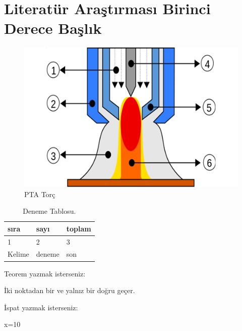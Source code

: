\section{Literatür Araştırması Birinci Derece Başlık}
\lipsum[1-2]
\begin{figure}[h]
\centering
\includegraphics[width=\textwidth]{gorseller/ptaTorc}
\caption{PTA Torç}\label{fig:PtaTorc1}
\end{figure}
\lipsum[1-2]
\begin{table}
\centering
\caption{Deneme Tablosu.}\label{tab:den1}
\begin{tabular}{|l|l|l|}
\hline
sıra   & sayı   & toplam \\ \hline
1      & 2      & 3      \\ \hline
Kelime & deneme & son    \\ \hline
\end{tabular}
\end{table}
Teorem yazmak isterseniz:
\begin{theorem}[Öklid]
 İki noktadan bir ve yalnız bir doğru geçer.
\end{theorem}

İspat yazmak isterseniz:
\begin{ispat}
x=10
\end{ispat}

